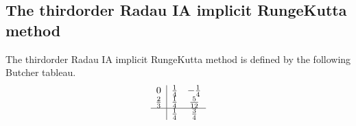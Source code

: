 \documentclass[letterpaper,10pt,english]{jupyterBook}
\begin{document}
\subsection{The third\sphinxhyphen{}order Radau IA implicit Runge\sphinxhyphen{}Kutta method}
\label{\detokenize{8_Appendices/8.1_Python:the-third-order-radau-ia-implicit-runge-kutta-method}}
\sphinxAtStartPar
The third\sphinxhyphen{}order Radau IA implicit Runge\sphinxhyphen{}Kutta method is defined by the following Butcher tableau.
\begin{align*}
    \begin{array}{c|cc}
        0 & \frac{1}{4} & -\frac{1}{4} \\
        \frac{2}{3} & \frac{1}{4} & \frac{5}{12} \\ \hline
        & \frac{1}{4} & \frac{3}{4}
    \end{array}
\end{align*}
\end{document}
